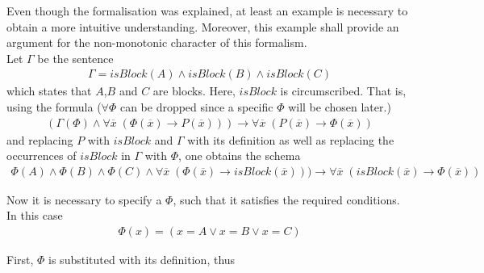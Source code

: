 \documentclass{article}
\begin{document}
Even though the formalisation was explained, at least an example is necessary to obtain a more intuitive understanding. Moreover, this example shall provide an argument for the non-monotonic character of this formalism. \\
Let $\Gamma$ be the sentence 
\begin{equation*}
\begin{split}
\Gamma = isBlock(A) \wedge isBlock(B) \wedge isBlock(C)
\end{split}
\end{equation*} 
which states that $A$,$B$ and $C$ are blocks. Here, $isBlock$ is circumscribed. That is, using the formula ($\forall \Phi$ can be  dropped since a specific $\Phi$ will be chosen later.)
\begin{equation*}
\begin{split}
(\Gamma(\Phi) \wedge  \forall \overline{x} \; (\Phi(\overline{x})\to P(\overline{x}))) \to \forall \overline{x} \; (P(\overline{x}) \to \Phi(\overline{x}))
\end{split}
\end{equation*}
and replacing $P$ with $isBlock$ and $\Gamma$ with its definition as well as replacing the occurrences of $isBlock$ in $\Gamma$ with $\Phi$, one obtains the schema
\begin{equation*}
\begin{split}
\Phi(A) \wedge \Phi(B) \wedge \Phi(C) \wedge \forall \overline{x} \; (\Phi(\overline{x})\to isBlock(\overline{x}))) \to \forall \overline{x} \; (isBlock(\overline{x}) \to \Phi(\overline{x}))
\end{split}
\end{equation*} 

Now it is necessary to specify a $\Phi$, such that it satisfies the required conditions.
In this case 
\begin{equation*}
\begin{split}
\Phi(x) = (x=A \vee x=B \vee x=C)
\end{split}
\end{equation*}

First, $\Phi$ is substituted with its definition, thus 
\end{document}
